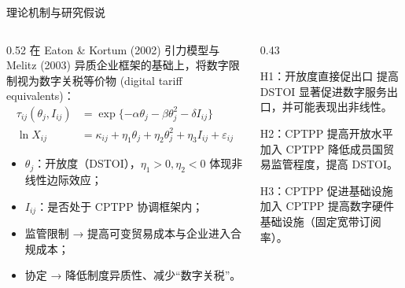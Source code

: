 \documentclass[aspectratio=169,10pt]{ctexbeamer}
\begin{document}
\begin{frame}{理论机制与研究假说}
  \begin{columns}[T,totalwidth=\textwidth]
    \begin{column}{0.52\textwidth}
      \small 在 Eaton \& Kortum (2002) 引力模型与 Melitz (2003) 异质企业框架的基础上，将数字限制视为\alert{数字关税等价物 (digital tariff equivalents)}：
      \begin{align*}
        \tau_{ij}(\theta_j,I_{ij}) &= \exp\{-\alpha\theta_j-\beta\theta_j^{2}-\delta I_{ij}\} \\[-0.2em]
        \ln X_{ij} &= \kappa_{ij}+\eta_1\theta_j+\eta_2\theta_j^{2}+\eta_3 I_{ij}+\varepsilon_{ij}
      \end{align*}
      \footnotesize
      \begin{itemize}
        \item $\theta_j$：开放度（DSTOI），$\eta_1>0,\eta_2<0$ 体现非线性边际效应；
        \item $I_{ij}$：是否处于 CPTPP 协调框架内；
        \item 监管限制 → 提高可变贸易成本与企业进入合规成本；
        \item 协定 → 降低制度异质性、减少“数字关税”。
      \end{itemize}
    \end{column}
    \begin{column}{0.43\textwidth}
      \begin{block}{H1：开放度直接促出口}
        \footnotesize 提高 DSTOI 显著促进数字服务出口，并可能表现出非线性。
      \end{block}
      \begin{block}{H2：CPTPP 提高开放水平}
        \footnotesize 加入 CPTPP 降低成员国贸易监管程度，提高 DSTOI。
      \end{block}
      \begin{block}{H3：CPTPP 促进基础设施}
        \footnotesize 加入 CPTPP 提高数字硬件基础设施（固定宽带订阅率）。
      \end{block}
    \end{column}
  \end{columns}
\end{frame}
\end{document}
